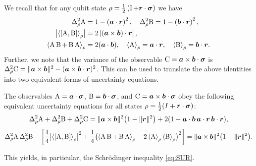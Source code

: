 We recall that
for any qubit state $\rho = \frac{1}{2}\left(\operatorname{I} + \bm{r}\cdot{\boldsymbol\sigma}\right)$ we have
\begin{align}
  \varr{\opa} &= 1-\left(\boa\cdot\bor\right)^2,\quad  \varr{\opb} = 1-\left(\bob\cdot\bor\right)^2,\\
  \bigl|\expr{\com{\opa}{\opb}}\bigr| &= 2\left|\left(\boa\times\bob\right)\cdot\bor\right|,\\
  \expr{\acom{\opa}{\opb}} &= 2(\boa\cdot\bob),\quad  \expr{\opa} = \boa\cdot\bor,\quad \expr{\opb} = \bob\cdot\bor.
\end{align}
Further, we note that the variance of the observable $\operatorname{C}=\bm{a}\times\bm{b}\cdot{\boldsymbol\sigma}$ is $\varr\opc=\|\boa\times\bob\|^2-(\boa\times\bob\cdot\bor)^2$.
This can be used to translate the above identities into two equivalent forms of uncertainty equations.


\begin{thm}\label{thm:3ur}
  The observables $\operatorname{A}=\bm{a}\cdot{\boldsymbol\sigma}$, $\operatorname{B}=\bm{b}\cdot{\boldsymbol\sigma}$, and $\operatorname{C}=\bm{a}\times\bm{b}\cdot{\boldsymbol\sigma}$ obey the following equivalent uncertainty equations for all states $\rho=\frac12(I+\bm{r}\cdot{\boldsymbol\sigma})$:
  \begin{equation}\label{eq:triple-ur}
    \varr\opa+\varr\opb+\varr\opc=\|\boa\times\bob\|^2\bigl(1-\|\bor\|^2\bigr)+2(1-\boa\cdot\bob\,\boa\cdot\bor\,\bob\cdot\bor),
  \end{equation}
\begin{equation}\label{eq:S-eq}
  \varr\opa\,\varr\opb-\left[\frac14 \bigl|\expr{\com{\opa}{\opb}}\bigr|^2+\frac14 \bigl(\expr{\acom{\opa}{\opb}}-2\expr{\opa}\expr{\opb}\bigr)^2\right]=\|\boa\times\bob\|^2\bigl(1-\|\bor\|^2\bigr).
\end{equation}
\end{thm}

This yields, in particular, the Schr\"odinger inequality \eqref{eq:SUR}.


